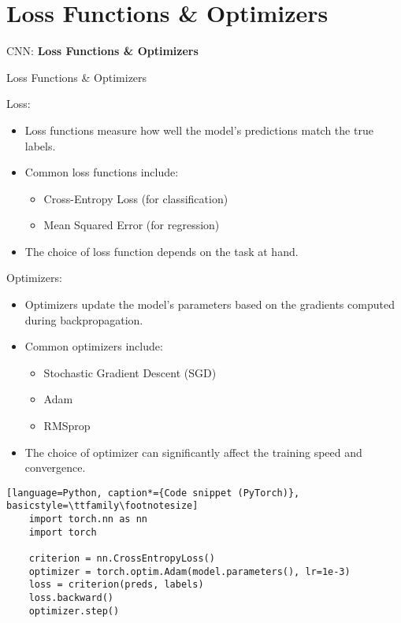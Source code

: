 \section{Loss Functions \& Optimizers}
\begin{frame}{}
    \LARGE CNN: \textbf{Loss Functions \& Optimizers}
\end{frame}

\begin{frame}{Loss Functions \& Optimizers}
    \begin{block}{Loss:}
        \begin{itemize}
            \item Loss functions measure how well the model's predictions match the true labels.
            \item Common loss functions include:
                \begin{itemize}
                    \item Cross-Entropy Loss (for classification)
                    \item Mean Squared Error (for regression)
                \end{itemize}
            \item The choice of loss function depends on the task at hand.
        \end{itemize}
    \end{block}

    \begin{block}{Optimizers:}
        \begin{itemize}
            \item Optimizers update the model's parameters based on the gradients computed during backpropagation.
            \item Common optimizers include:
                \begin{itemize}
                    \item Stochastic Gradient Descent (SGD)
                    \item Adam
                    \item RMSprop
                \end{itemize}
            \item The choice of optimizer can significantly affect the training speed and convergence.
        \end{itemize}
    \end{block}

    \begin{lstlisting}[language=Python, caption*={Code snippet (PyTorch)}, basicstyle=\ttfamily\footnotesize]
    import torch.nn as nn
    import torch

    criterion = nn.CrossEntropyLoss()
    optimizer = torch.optim.Adam(model.parameters(), lr=1e-3)
    loss = criterion(preds, labels)
    loss.backward()
    optimizer.step()
    \end{lstlisting}
\end{frame}  